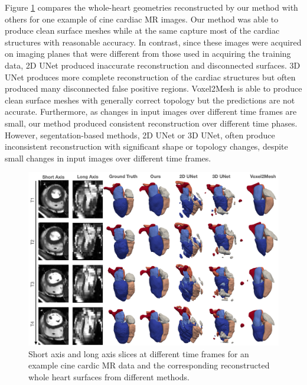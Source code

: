 \documentclass[times,review,preprint,authoryear]{elsarticle}
\begin{document}
Figure \ref{figure:ucsf} compares the whole-heart geometries reconstructed by our method with others for one example of cine cardiac MR images. Our method was able to produce clean surface meshes while at the same capture most of the cardiac structures with reasonable accuracy. In contrast, since these images were acquired on imaging planes that were different from those used in acquiring the training data, 2D UNet produced inaccurate reconstruction and disconnected surfaces. 3D UNet produces more complete reconstruction of the cardiac structures but often produced many disconnected false positive regions. Voxel2Mesh is able to produce clean surface meshes with generally correct topology but the predictions are not accurate. Furthermore, as changes in input images over different time frames are small, our method produced consistent reconstruction over different time phases. However, segentation-based methods, 2D UNet or 3D UNet, often produce inconsistent reconstruction with significant shape or topology changes, despite small changes in input images over different time frames. 
\begin{figure}[H]
\centering
\includegraphics[width=\textwidth]{ucsf2.png}
\caption{Short axis and long axis slices at different time frames for an example cine cardic MR data and the corresponding reconstructed whole heart surfaces from different methods.} 
\label{figure:ucsf}
\end{figure}
\end{document}
